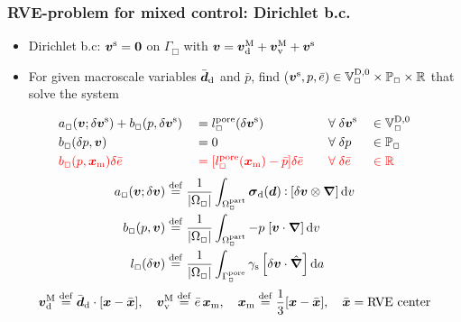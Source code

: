\documentclass[11pt]{beamer} %
\renewcommand{\dev}{\mathrm{d}}
\renewcommand{\vol}{\mathrm{v}}
\newcommand{\surf}{\mathrm{s}}
\newcommand{\pore}{\mathrm{pore}}
\newcommand{\particle}{\mathrm{part}}
\begin{document}
\begin{frame}
\frametitle{RVE-problem for mixed control: Dirichlet b.c.}
 \begin{itemize}
  \item Dirichlet b.c: $\boldsymbol{v}^{\mathrm{s}} = \boldsymbol{0}$ on $\Gamma_\Box$ with $\ta v = \ta v^\macro_\dev + \ta v^\macro_\vol + \ta v^\fluct$
  \item For given macroscale variables $\bar{\ts d}_\dev$ and $\bar p$, find ($\boldsymbol{v}^{\mathrm{s}},p,\bar{e})\in\mathbb{V}_\Box^{\mathrm{D},0}\times\mathbb{P}_\Box\times\mathbb{R}$ that solve the system
 \end{itemize}
\vspace{-2truemm}
\begin{alignat*}{4}
    & a_\Box(\ta{v};\delta \ta{v}^\fluct) +  b_\Box(p,\delta\ta{v}^\fluct)
    && =
    l^\pore_\Box(\delta \ta{v}^\fluct)
    &\quad& \forall\; \delta \ta{v}^\fluct &&\in \set{V}_\Box^{\Dirichlet,0}
 \\
    &b_\Box(\delta p, \ta{v})
    && =
    0
    && \forall\; \delta p &&\in \set{P}_\Box
\\
    &\color{red}b_\Box(p,\ta{x}_\mean)\delta\bar{e}
    &&\color{red} =
    [l_\Box^\pore(\ta{x}_\mean) - \bar{p}]\delta\bar{e}
    &&\color{red} \forall\; \delta\bar{e} &&\color{red}\in \set{R}
\end{alignat*}
\vspace{-5truemm}
\begin{align*}
    a_\Box(\ta{v};\delta \ta{v})
    & \defeq
    \frac{1}{|\Omega_\Box|}\int_{\Omega^\particle_\Box} \ta{\sigma}_\dev(\ta{d}) \dprod \left[\delta \ta{v} \outerp \diff\right] \dif v
\\
    b_\Box(p, \ta{v})
    & \defeq
    \frac{1}{|\Omega_\Box|}\int_{\Omega^\particle_\Box} -p\;[\ta{v}\cdot \diff] \dif v
\\
    l_\Box(\delta \ta{v})
    & \defeq
    \frac{1}{|\Omega_{\Box}|} \int_{\Gamma_{\Box}^\pore}
  \gamma_\surf\left[\delta\ta{v}\cdot\hat{\ta\nabla}\right] \dif a
\end{align*}
\begin{gather*}
 \ta v_\dev^\macro \defeq \bar{\ts d}_\dev \cdot[\ta x - \bar{\ta x}], \quad \ta v_\vol^\macro \defeq \bar{e}\,\ta x_\mean,\quad \ta{x}_\mean \defeq \frac13[\ta x-\bar{\ta x}], \quad \bar{\ta x} = \text{RVE center}
\end{gather*}
\end{frame}
\end{document}
